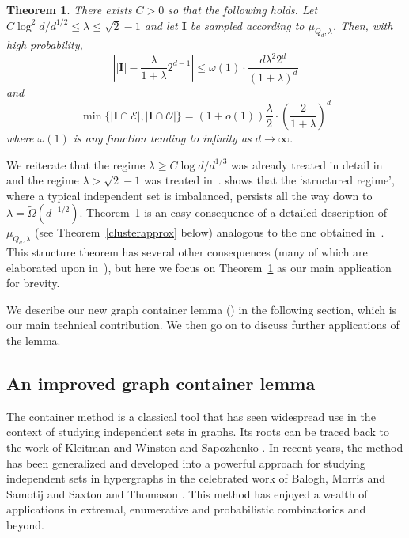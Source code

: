 \documentclass[a4paper]{amsart}
\newtheorem{thm}{Theorem}[section]
\theoremstyle{definition}
\newcommand{\cO}{\mathcal{O} }
\newcommand{\cE}{\mathcal{E} }
\newcommand{\beq}[1]{\begin{equation}\label{#1}}
\newcommand{\enq}[0]{\end{equation}}
\newcommand{\0}[0]{\emptyset}
\newcommand{\lam}{\lambda}
\begin{document}
\begin{thm}\label{thm:main} There exists $C>0$ so that the following holds.  Let $C\log^2d /d^{1/2}\leq \lam \leq \sqrt{2}-1$ and let $\mathbf{I}$ be sampled according to $\mu_{Q_d,\lam}$. Then, with high probability,
 \beq{expbig} \left| |\mathbf{I}| - \frac{\lam}{1+\lam}2^{d-1}\right| \leq \omega(1)\cdot\frac{d\lam^2 2^d}{(1+\lam)^d} \enq
 and
    \beq{expcube} \min\{ |\mathbf{I}\cap \cE|, |\mathbf{I}\cap \cO|\} =(1+o(1))\frac{\lam}{2}\cdot\left(\frac{2}{1+\lam}\right)^d\enq
    where $\omega(1)$ is any function tending to infinity as $d\rightarrow\infty$.
\end{thm}

We reiterate that the regime $\lam\geq C \log d/d^{1/3}$ was already treated in detail in~\cite{galvin_threshold,hypercube} and the regime $\lam > \sqrt{2}-1$ was treated in~\cite{galvin_threshold}.  shows that the `structured regime', where a typical independent set is imbalanced, persists all the way down to $\lam=\tilde \Omega(d^{-1/2})$. Theorem~\ref{thm:main} is an easy consequence of a detailed description of $\mu_{Q_d,\lam}$ (see Theorem~\ref{clusterapprox} below) analogous to the one obtained in~\cite{hypercube}.  This structure theorem has several other consequences (many of which are elaborated upon in~\cite{hypercube}), but here we focus on Theorem~\ref{thm:main} as our main application for brevity. 

We describe our new graph container lemma () in the following section, which is our main technical contribution. We then go on to discuss further applications of the lemma. 

\subsection{An improved graph container lemma}\label{subsec:containers}

The container method is a classical tool that has seen widespread use in the context of studying independent sets in graphs. Its roots can be traced back to the work of Kleitman and Winston \cite{kleitman1982number} and Sapozhenko \cite{sapocontainer}. In recent years, the method has been generalized and developed into a powerful approach for studying independent sets in hypergraphs in the celebrated work of Balogh, Morris and Samotij \cite{balogh2015independent} and Saxton and Thomason \cite{saxton2015hypergraph}. This method has enjoyed a wealth of applications in extremal, enumerative and probabilistic combinatorics and beyond.
\end{document}
